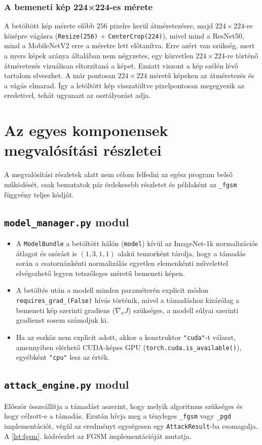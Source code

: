 \subsubsection{A bemeneti kép 224×224-es mérete}
A betöltött kép mérete előbb $256$ pixelre kerül átméretezésre, majd $224\times224$-re középre vágásra (\texttt{Resize(256)} + 
\texttt{CenterCrop(224)}), mivel mind a ResNet50, mind a MobileNetV2 erre a méretre lett előtanítva. 
Erre azért van szükség, mert a nyers képek aránya általában nem négyzetes, egy közvetlen $224\times224$-re történő átméretezés 
vizuálisan eltorzítaná a képet. 
Emiatt viszont a kép szélén lévő tartalom elveszhet. 
A már pontosan $224\times224$ méretű képeken az átméretezés és a vágás elmarad. 
Így a letöltött kép visszatöltve pixelpontosan megegyezik az eredetivel, tehát ugyanazt az osztályozást adja. 

\section{Az egyes komponensek megvalósítási részletei}
A megvalósítási részletek alatt nem célom felfedni az egész program belső működését, csak bemutatok pár érdekesebb részletet és 
példaként az \texttt{\_fgsm} függvény teljes kódját.
\subsection{\texttt{model\_manager.py} modul}
\begin{itemize}
  \item A \texttt{ModelBundle} a betöltött hálón (\texttt{model}) kívül az ImageNet-1k normalizációs átlagot és szórást is $(1, 
        3, 1, 1)$ alakú tenzorként tárolja, hogy a támadás során a csatornánkénti normalizálás egyetlen elemenkénti művelettel 
        elvégezhető legyen tetszőleges méretű bemeneti képen. 
  \item A betöltés után a modell minden paraméterén explicit módon \texttt{requires\_grad\_(False)} hívás történik, mivel a 
        támadáshoz kizárólag a bemeneti kép szerinti gradiens ($\nabla_x J$) szükséges, a modell súlyai szerinti gradienst sosem 
        számoljuk ki. 
  \item Ha az eszköz nem explicit adott, akkor a konstruktor \texttt{"cuda"}-t választ, amennyiben elérhető CUDA-képes GPU 
        (\texttt{torch.cuda.is\_available()}), egyébként \texttt{"cpu"} lesz az érték. 
\end{itemize}

\subsection{\texttt{attack\_engine.py} modul}
Először összeállítja a támadást aszerint, hogy melyik algoritmus szükséges és hogy célzott-e a támadás. 
Ezután hívja meg a tényleges \texttt{\_fgsm} vagy \texttt{\_pgd} implementációt, végül az eredményt egységesen egy 
\texttt{AttackResult}-ba csomagolja. 
A \ref{lst:fgsm}. kódrészlet az FGSM implementációját mutatja. 

